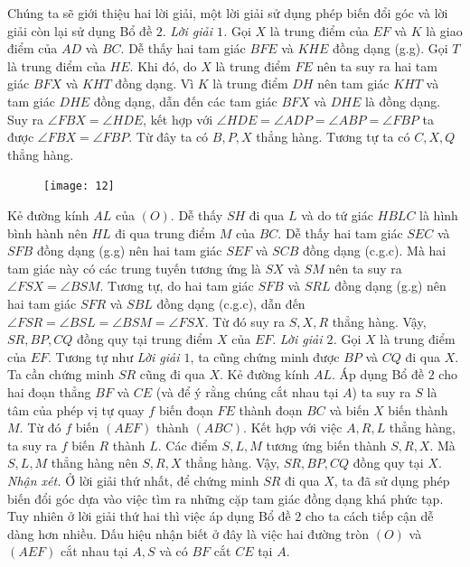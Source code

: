 \begin{multicols}{2}
	\vskip 0.1cm
	Chúng ta sẽ giới thiệu hai lời giải, một lời giải sử dụng phép biến đổi góc và lời giải còn lại sử dụng Bổ đề $2$.
	\vskip 0.1cm
	\textit{Lời giải $1$.} Gọi $X$ là trung điểm của $EF$ và $K$ là giao điểm của $AD$ và $BC$. Dễ thấy hai tam giác $BFE$ và $KHE$ đồng dạng (g.g). Gọi $T$ là trung điểm của $HE$. Khi đó, do $X$ là trung điểm $FE$ nên ta suy ra hai tam giác $BFX$ và $KHT$ đồng dạng. Vì $K$ là trung điểm $DH$ nên tam giác $KHT$ và tam giác $DHE$ đồng dạng, dẫn đến các tam giác $BFX$ và $DHE$ là đồng dạng. Suy ra  $\angle{FBX}= \angle{HDE}$, kết hợp với  $\angle{HDE}=\angle{ADP} = \angle{ABP}=\angle{FBP} $ ta được  $\angle{FBX}= \angle{FBP}.$ Từ đây ta có $B,P,X$ thẳng hàng. Tương tự ta có $C,X,Q$ thẳng hàng.
	\begin{figure}[H]
		\vspace*{-10pt}
		\centering
		\captionsetup{labelformat= empty, justification=centering}
		\texttt{[image: 12]}
		\vspace*{-15pt}
	\end{figure}
	Kẻ đường kính $AL$ của $(O)$. Dễ thấy $SH$ đi qua $L$ và do tứ giác $HBLC$ là hình bình hành nên $HL$ đi qua trung điểm $M$ của $BC$. Dễ thấy hai tam giác $SEC$ và $SFB$ đồng dạng (g.g) nên hai tam giác $SEF$ và $SCB$ đồng dạng (c.g.c). Mà hai tam giác này có các trung tuyến tương ứng là $SX$ và $SM$ nên ta suy ra $\angle FSX =  \angle BSM$. Tương tự, do hai tam giác $SFB$ và $SRL$ đồng dạng (g.g) nên hai tam giác $SFR$ và $SBL$ đồng dạng (c.g.c), dẫn đến  $\angle FSR=\angle BSL=\angle BSM=\angle FSX$. Từ đó suy ra $S,X,R$ thẳng hàng. Vậy, $SR,BP,CQ$ đồng quy tại trung điểm $X$ của $EF$.
	\vskip 0.1cm
	\textit{Lời giải $2$.} Gọi $X$ là trung điểm của $EF$. Tương tự như \textit{Lời giải $1$}, ta cũng chứng minh được $BP$ và $CQ$ đi qua $X$. Ta cần chứng minh $SR$ cũng đi qua $X$. Kẻ đường kính $AL$. Áp dụng Bổ đề $2$ cho hai đoạn thẳng $BF$ và $CE$ (và để ý rằng chúng cắt nhau tại $A$) ta suy ra $S$ là tâm của phép vị tự quay $f$ biến đoạn $FE$ thành đoạn $BC$ và biến $X$ biến thành $M$. Từ đó $f$ biến $(AEF)$ thành $(ABC)$. Kết hợp với việc $A,R,L$ thẳng hàng, ta suy ra $f$ biến $R$ thành $L$. Các điểm $S,L,M$ tương ứng biến thành $S,R,X$. Mà  $S,L,M$ thẳng hàng nên $S,R,X$ thẳng hàng. Vậy, $SR,BP,CQ$ đồng quy tại $X$.
	\vskip 0.1cm
	\textit{Nhận xét.} Ở lời giải thứ nhất, để chứng minh $SR$ đi qua $X$, ta đã sử dụng phép biến đổi góc dựa vào việc tìm ra những cặp tam giác đồng dạng khá phức tạp. Tuy nhiên ở lời giải thứ hai thì việc áp dụng Bổ đề $2$ cho ta cách tiếp cận dễ dàng hơn nhiều. Dấu hiệu nhận biết ở đây là việc hai đường tròn $(O)$ và $(AEF)$ cắt nhau tại $ A,S$ và có $BF$ cắt $CE$ tại $A$.

\end{multicols}
